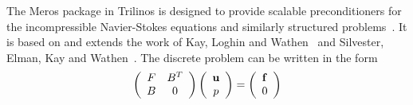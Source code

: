 \documentclass[acmtoms,acmnow]{acmtrans2m}
\begin{document}
The Meros package in Trilinos is designed to provide scalable
preconditioners for the incompressible Navier-Stokes equations and similarly
structured problems~\cite{ElmaHowlShadTumi2003}.  
It is based on and extends the work of Kay,
Loghin and Wathen~\cite{KayLoghWath2002} and Silvester, Elman, Kay and
Wathen~\cite{SilvElmaKayWath2001}.  
The discrete problem can be written in the form
\begin{equation}
\label{eq:NSmatrix}
\left(\begin{array}{cc}
	F & B^T \\
	B & 0 \\
\end{array}\right)
\left(\begin{array}{c}
	{\bf u} \\
	p \\
\end{array}\right)
=
\left(\begin{array}{c}
	{\bf f} \\
	0 \\
	\end{array}\right)
\end{equation}
\end{document}
